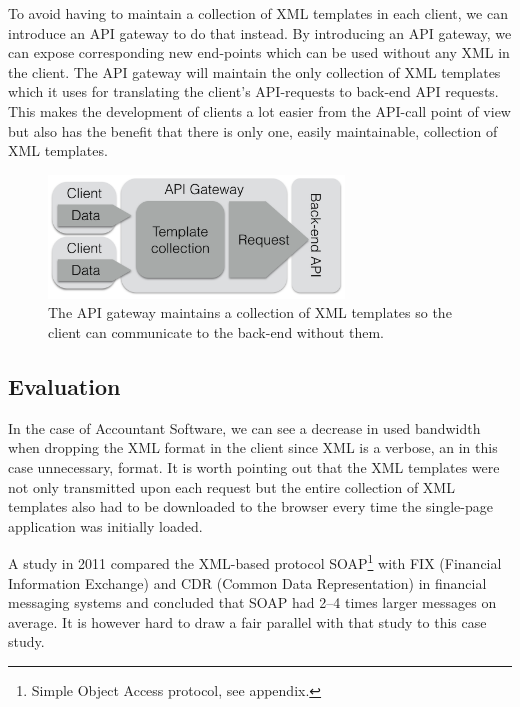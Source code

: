 \documentclass{cslthse-msc}
\begin{document}
To avoid having to maintain a collection of XML templates in each client, we can introduce an API gateway to do that instead. By introducing an API gateway, we can expose corresponding new end-points which can be used without any XML in the client. The API gateway will maintain the only collection of XML templates which it uses for translating the client's API-requests to back-end API requests. This makes the development of clients a lot easier from the API-call point of view but also has the benefit that there is only one, easily maintainable, collection of XML templates.

\begin{figure}[H]
  \centering
    \begin{center}
      \includegraphics[width=0.7\textwidth]{images/gateway_templates.png}
    \end{center}
  \caption{The API gateway maintains a collection of XML templates so the client can communicate to the back-end without them.}
\end{figure}

\subsection{Evaluation}

In the case of Accountant Software, we can see a decrease in used bandwidth when dropping the XML format in the client since XML is a verbose, an in this case unnecessary, format. It is worth pointing out that the XML templates were not only transmitted upon each request but the entire collection of XML templates also had to be downloaded to the browser every time the single-page application was initially loaded. 

A study in 2011 compared the XML-based protocol SOAP\footnote{Simple Object Access protocol, see appendix.} with FIX (Financial Information Exchange) and CDR (Common Data Representation) in financial messaging systems and concluded that SOAP had 2--4 times larger messages on average\cite{soap_fix}. It is however hard to draw a fair parallel with that study to this case study.
\end{document}
